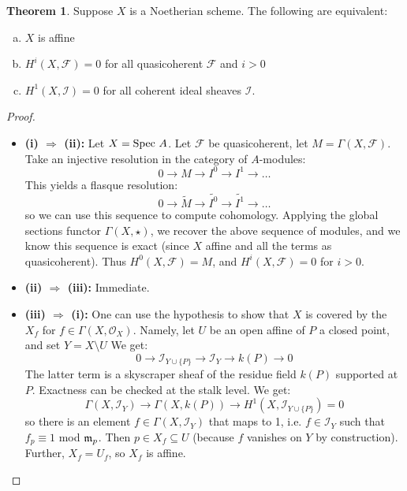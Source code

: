 \documentclass[10pt,reqno]{amsart}
\theoremstyle{definition}
\newtheorem{theorem}{Theorem}
\theoremstyle{remark}
\numberwithin{equation}{section}
\numberwithin{theorem}{section}
\newcommand{\OO}{{\mathcal O}}
\newcommand{\spec}{\textup{Spec }}
\newcommand{\FF}{{\mathscr F}}
\newcommand{\II}{{\mathscr I}}
\newcommand{\mm}{\frak{m}}
\newcommand{\wt}{\widetilde}
\begin{document}
\begin{theorem} Suppose $X$ is a Noetherian scheme. The following are equivalent:
\begin{enumerate}[(a)]
\item $X$ is affine
\item $H^i(X, \FF) = 0$ for all quasicoherent $\FF$ and $i > 0$
\item $H^1(X, \II) = 0$ for all coherent ideal sheaves $\II$.
\end{enumerate}
\end{theorem}
\begin{proof}\textup{ }
\begin{itemize}
\item \textbf{(i) $\Rightarrow$ (ii):} Let $X = \spec A$. Let $\FF$ be quasicoherent, let $M = \Gamma(X,\FF)$. Take an injective resolution in the category of $A$-modules:
\[0 \to M \to I^0 \to I^1 \to \dots\]
This yields a flasque resolution:
\[0 \to \wt{M} \to \wt{I^0} \to \wt{I^1} \to \dots\]
so we can use this sequence to compute cohomology. Applying the global sections functor $\Gamma(X,\star)$, we recover the above sequence of modules, and we know this sequence is exact (since $X$ affine and all the terms as quasicoherent). Thus $H^0(X,\FF) = M$, and $H^i(X,\FF) = 0$ for $i > 0$.
\item \textbf{(ii) $\Rightarrow$ (iii):} Immediate.
\item \textbf{(iii) $\Rightarrow$ (i):} One can use the hypothesis to show that $X$ is covered by the $X_{f}$ for $f \in \Gamma(X,\OO_X)$. Namely, let $U$ be an open affine of $P$ a closed point, and set $Y = X \setminus U$ We get:
\[0 \to \II_{Y \cup \{P\}} \to \II_Y \to k(P) \to 0\]
The latter term is a skyscraper sheaf of the residue field $k(P)$ supported at $P$. Exactness can be checked at the stalk level. We get:
\[\Gamma(X,\II_Y) \to \Gamma(X,k(P)) \to H^1(X,\II_{Y \cup \{P\}}) = 0\]
so there is an element $f \in \Gamma(X,\II_Y)$ that maps to 1, i.e. $f \in \II_Y$ such that $f_p \equiv 1$ mod $\mm_p$. Then $p \in X_f \subseteq U$ (because $f$ vanishes on $Y$ by construction). Further, $X_f = U_f$, so $X_f$ is affine.


\end{itemize}
\end{proof}
\end{document}
